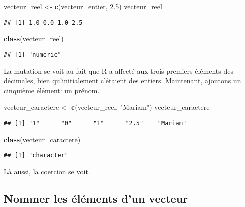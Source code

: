 \documentclass[]{book}
\newenvironment{Shaded}{\begin{snugshade}}{\end{snugshade}}
\newcommand{\KeywordTok}[1]{\textcolor[rgb]{0.13,0.29,0.53}{\textbf{#1}}}
\newcommand{\FloatTok}[1]{\textcolor[rgb]{0.00,0.00,0.81}{#1}}
\newcommand{\StringTok}[1]{\textcolor[rgb]{0.31,0.60,0.02}{#1}}
\newcommand{\NormalTok}[1]{#1}
\begin{document}
\begin{Shaded}
\begin{Highlighting}[]
\NormalTok{vecteur_reel <-}\StringTok{ }\KeywordTok{c}\NormalTok{(vecteur_entier, }\FloatTok{2.5}\NormalTok{)}
\NormalTok{vecteur_reel}
\end{Highlighting}
\end{Shaded}

\begin{verbatim}
## [1] 1.0 0.0 1.0 2.5
\end{verbatim}

\begin{Shaded}
\begin{Highlighting}[]
\KeywordTok{class}\NormalTok{(vecteur_reel)}
\end{Highlighting}
\end{Shaded}

\begin{verbatim}
## [1] "numeric"
\end{verbatim}

La mutation se voit au fait que R a affecté aux trois premiers éléments
des décimales, bien qu'initialement c'étaient des entiers. Maintenant,
ajoutons un cinquième élément: un prénom.

\begin{Shaded}
\begin{Highlighting}[]
\NormalTok{vecteur_caractere <-}\StringTok{ }\KeywordTok{c}\NormalTok{(vecteur_reel, }\StringTok{"Mariam"}\NormalTok{)}
\NormalTok{vecteur_caractere}
\end{Highlighting}
\end{Shaded}

\begin{verbatim}
## [1] "1"      "0"      "1"      "2.5"    "Mariam"
\end{verbatim}

\begin{Shaded}
\begin{Highlighting}[]
\KeywordTok{class}\NormalTok{(vecteur_caractere)}
\end{Highlighting}
\end{Shaded}

\begin{verbatim}
## [1] "character"
\end{verbatim}

Là aussi, la coercion se voit.

\subsection{Nommer les éléments d'un
vecteur}\label{nommer-les-elements-dun-vecteur}
\end{document}
